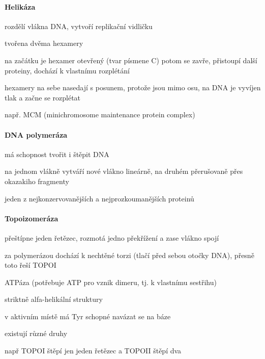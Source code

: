 \documentclass[DIV=8]{scrreprt}
\begin{document}
\paragraph{Helikáza}
\begin{myItemize}[nosep]
    \item rozdělí vlákna DNA, vytvoří replikační vidličku
    \item tvořena dvěma hexamery
\begin{myItemize}[nosep]
    \item na začátku je hexamer otevřený (tvar písmene C) potom se zavře, přistoupí další proteiny, dochází k vlastnímu rozplétání
    \item hexamery na sebe nasedají s posunem, protože jsou mimo osu, na DNA je vyvíjen tlak a začne se rozplétat
\end{myItemize}

    \item např. MCM (minichromosome maintenance protein complex)
\end{myItemize}



\paragraph{DNA polymeráza}
\begin{myItemize}[nosep]
    \item má schopnost tvořit i štěpit DNA
    \item na jednom vlákně vytváří nové vlákno lineárně, na druhém přerušovaně přes okazakiho fragmenty
    \item jeden z nejkonzervovanějších a nejprozkoumanějších proteinů
\end{myItemize}



\paragraph{Topoizomeráza}
\begin{myItemize}[nosep]
    \item přeštípne jeden řetězec, rozmotá jedno překřížení a zase vlákno spojí
\begin{myItemize}[nosep]
    \item za polymerázou dochází k nechtěné torzi (tlačí před sebou otočky DNA), přesně toto řeší TOPOI
\end{myItemize}

    \item ATPáza (potřebuje ATP pro vznik dimeru, tj. k vlastnímu sestřihu)
    \item striktně alfa-helikální struktury
    \item v aktivním místě má Tyr schopné navázat se na báze
    \item existují různé druhy
\begin{myItemize}[nosep]
    \item např TOPOI štěpí jen jeden řetězec a TOPOII štěpí dva
\end{myItemize}

\end{myItemize}
\end{document}
